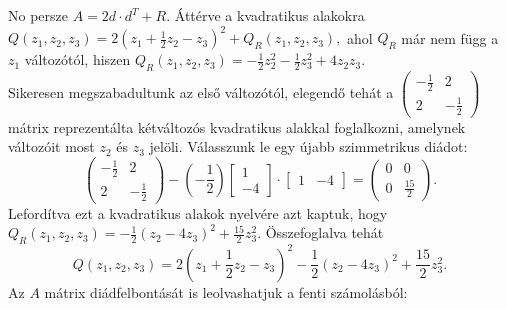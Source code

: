 \documentclass[9pt, a4paper, showtrims]{memoir}
\theoremstyle{plain}
\theoremstyle{remark}
\theoremstyle{definition}
\begin{document}
    No persze $A=2d\cdot d^T+R$.
    Áttérve a kvadratikus alakokra
    \(
        Q\left( z_1,z_2,z_3 \right)=2\left( z_1+\frac{1}{2}z_2-z_3 \right)^2+Q_R\left( z_1,z_2,z_3 \right),
    \)
    ahol $Q_R$ már nem függ a $z_1$ változótól, 
    hiszen $Q_R\left( z_1,z_2,z_3 \right)=-\frac{1}{2}z_2^2-\frac{1}{2}z_3^2+4z_2z_3$.
    \\
    Sikeresen megszabadultunk az első változótól, elegendő tehát a 
    \(
    \begin{pmatrix}
        -\frac{1}{2}&2\\
        2&-\frac{1}{2}
    \end{pmatrix}
    \)
    mátrix reprezentálta kétváltozós kvadratikus alakkal foglalkozni, amelynek változóit most $z_2$ és $z_3$ jelöli.
    Válasszunk le egy újabb szimmetrikus diádot:
    \[
        \begin{pmatrix}
            -\frac{1}{2}&2\\
            2&-\frac{1}{2}
        \end{pmatrix}
        -\left( -\frac{1}{2} \right)
        \begin{bmatrix}
            1\\-4
        \end{bmatrix}
        \cdot
        \begin{bmatrix}
            1&-4
        \end{bmatrix}
        =
        \begin{pmatrix}
            0&0\\
            0&\frac{15}{2}
        \end{pmatrix}.
    \]
    Lefordítva ezt a kvadratikus alakok nyelvére azt kaptuk,
    hogy
    \(
        Q_R\left( z_1,z_2,z_3 \right)
        =
        -\frac{1}{2}\left( z_2-4z_3 \right)^2+\frac{15}{2}z_3^2.
    \)
    Összefoglalva tehát
    \[
        Q\left( z_1,z_2,z_3 \right)
        =
        2\left( z_1+\frac{1}{2}z_2-z_3 \right)^2
        -\frac{1}{2}\left( z_2-4z_3 \right)^2
        +\frac{15}{2}z_3^2.
    \]
    Az $A$ mátrix diádfelbontását is leolvashatjuk a fenti számolásból:
\end{document}

